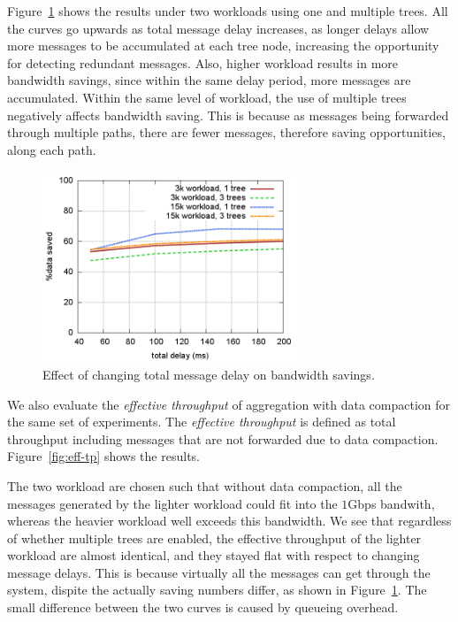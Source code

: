 Figure~\ref{fig:savings} shows the results under two workloads using one and
multiple trees.  All the curves go upwards as total message delay increases, as
longer delays allow more messages to be accumulated at each tree node,
increasing the opportunity for detecting redundant messages.  Also, higher
workload results in more bandwidth savings, since within the same delay period,
more messages are accumulated.  Within the same level of workload, the use of
multiple trees negatively affects bandwidth saving.  This is because as
messages being forwarded through multiple paths, there are fewer messages,
therefore saving opportunities, along each path.

\begin{figure}[t]
\begin{center}
\includegraphics[width=3in]{img/savings.png}
\end{center}
\caption{\label{fig:savings} Effect of changing total message delay on
bandwidth savings.}
\end{figure}

We also evaluate the \emph{effective throughput} of aggregation with data
compaction for the same set of experiments.  The \emph{effective throughput} is
defined as total throughput including messages that are not forwarded due to
data compaction.  Figure~\ref{fig:eff-tp} shows the results. 

The two workload are chosen such that without data compaction, all the messages
generated by the lighter workload could fit into the $1$Gbps bandwith, whereas
the heavier workload well exceeds this bandwidth.  We see that regardless of
whether multiple trees are enabled, the effective throughput of the lighter
workload are almost identical, and they stayed flat with respect to changing
message delays.  This is because virtually all the messages can get through the
system, dispite the actually saving numbers differ, as shown in
Figure~\ref{fig:savings}.  The small difference between the two curves is
caused by queueing overhead.

